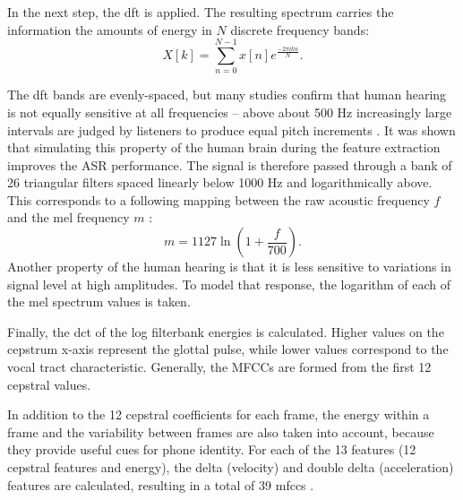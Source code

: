 In the next step, the \gls{dft} is applied. The resulting spectrum carries the information the amounts of energy in $N$ discrete frequency bands:
\begin{equation}
  X[k]=\sum_{n=0}^{N-1}x[n]e^{\frac{-2\pi ikn}{N}}.
\end{equation}

The \gls{dft} bands are evenly-spaced, but many studies confirm that human hearing is not equally sensitive at all frequencies -- above about 500 Hz increasingly large intervals are judged by listeners to produce equal pitch increments \cite{stevens1937scale, fletcher1938loudness}. It was shown that simulating this property of the human brain during the feature extraction improves the ASR performance. The signal is therefore passed through a bank of 26 triangular filters spaced linearly below 1000 Hz and logarithmically above. This corresponds to a following mapping between the raw acoustic frequency $f$ and the mel frequency $m$ \cite{muda2010voice}:
\begin{equation}
  m=1127\ln(1+\frac{f}{700}).
\end{equation}
Another property of the human hearing is that it is less sensitive to variations in signal level at high amplitudes. To model that response, the logarithm of each of the mel spectrum values is taken.

Finally, the \gls{dct} of the log filterbank energies is calculated. Higher values on the cepstrum x-axis represent the glottal pulse, while lower values correspond to the vocal tract characteristic. Generally, the MFCCs are formed from the first 12 cepstral values.

In addition to the 12 cepstral coefficients for each frame, the energy within a frame and the variability between frames are also taken into account, because they provide useful cues for phone identity. For each of the 13 features (12 cepstral features and energy), the delta (velocity) and double delta (acceleration) features are calculated, resulting in a total of 39 \glspl{mfcc} \cite{jurafsky2000speech}.

